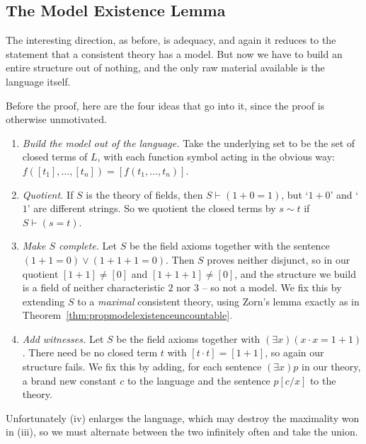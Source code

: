 \subsection{The Model Existence Lemma}

The interesting direction, as before, is adequacy, and again it reduces to the statement that a consistent theory has a model. But now we have to build an entire structure out of nothing, and the only raw material available is the language itself.

Before the proof, here are the four ideas that go into it, since the proof is otherwise unmotivated.

\begin{enumerate}[label=(\roman*)]
  \item \emph{Build the model out of the language.} Take the underlying set to be the set of closed terms of $L$, with each function symbol acting in the obvious way: $f([t_1], \dots, [t_n]) = [f(t_1, \dots, t_n)]$.
  \item \emph{Quotient.} If $S$ is the theory of fields, then $S \vdash (1 + 0 = 1)$, but `$1+0$' and `$1$' are different strings. So we quotient the closed terms by $s \sim t$ if $S \vdash (s = t)$.
  \item \emph{Make $S$ complete.} Let $S$ be the field axioms together with the sentence $(1+1 = 0) \lor (1+1+1 = 0)$. Then $S$ proves neither disjunct, so in our quotient $[1+1] \neq [0]$ and $[1+1+1] \neq [0]$, and the structure we build is a field of neither characteristic $2$ nor $3$ -- so not a model. We fix this by extending $S$ to a \emph{maximal} consistent theory, using Zorn's lemma exactly as in Theorem~\ref{thm:propmodelexistenceuncountable}.
  \item \emph{Add witnesses.} Let $S$ be the field axioms together with $(\exists x)(x \cdot x = 1+1)$. There need be no closed term $t$ with $[t \cdot t] = [1+1]$, so again our structure fails. We fix this by adding, for each sentence $(\exists x)p$ in our theory, a brand new constant $c$ to the language and the sentence $p[c/x]$ to the theory.
\end{enumerate}
Unfortunately (iv) enlarges the language, which may destroy the maximality won in (iii), so we must alternate between the two infinitely often and take the union.

